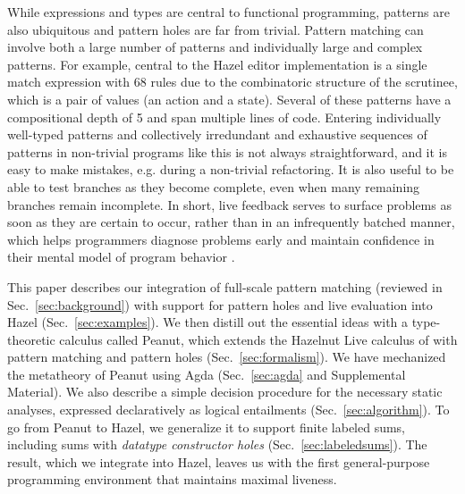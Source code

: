 While expressions and types are central to functional programming, patterns are also ubiquitous and pattern holes are far from trivial. Pattern matching can involve both a large number of patterns and individually large and complex patterns. For example, central to the Hazel editor implementation is a single match expression with 68 rules due to the combinatoric structure of the scrutinee, which is a pair of values (an action and a state). Several of these patterns have a compositional depth of 5 and span multiple lines of code. Entering individually well-typed patterns and collectively irredundant and exhaustive sequences of patterns in non-trivial programs like this is not always straightforward, and it is easy to make mistakes, e.g. during a non-trivial refactoring. It is also useful to be able to test branches as they become complete, even when many remaining branches remain incomplete. In short, live feedback serves to surface problems as soon as they are certain to occur, rather than in an infrequently batched manner, which helps programmers diagnose problems early and maintain confidence in their mental model of program behavior \cite{tanimoto2013perspective}.

This paper describes our integration of full-scale pattern matching (reviewed in Sec.~\ref{sec:background}) with support for pattern holes and live evaluation into Hazel (Sec.~\ref{sec:examples}). We then distill out the essential ideas with a type-theoretic calculus called Peanut, which extends the Hazelnut Live calculus of \citet{DBLP:journals/pacmpl/OmarVCH19} with pattern matching and pattern holes (Sec.~\ref{sec:formalism}). We have mechanized the metatheory of Peanut using Agda (Sec.~\ref{sec:agda} and Supplemental Material). We also describe a simple decision procedure for the necessary static analyses, expressed declaratively as logical entailments (Sec.~\ref{sec:algorithm}). To go from Peanut to Hazel, we generalize it to support finite labeled sums, including sums with \emph{datatype constructor holes} (Sec.~\ref{sec:labeledsums}). The result, which we integrate into Hazel, leaves us with the first general-purpose programming environment that maintains maximal liveness.

